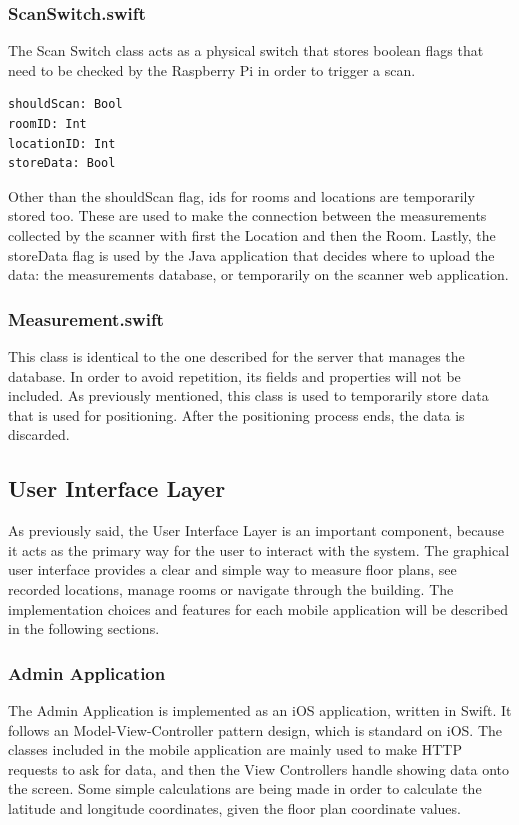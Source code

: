 \subsubsection*{ScanSwitch.swift}

The Scan Switch class acts as a physical switch that stores boolean flags that need to be checked by the Raspberry Pi in order to trigger a scan. 

\begin{lstlisting}
shouldScan: Bool
roomID: Int
locationID: Int
storeData: Bool
\end{lstlisting}

\noindent
Other than the shouldScan flag, ids for rooms and locations are temporarily stored too. These are used to make the connection between the measurements collected by the scanner with first the Location and then the Room. Lastly, the storeData flag is used by the Java application that decides where to upload the data: the measurements database, or temporarily on the scanner web application.

\subsubsection*{Measurement.swift}
This class is identical to the one described for the server that manages the database. In order to avoid repetition, its fields and properties will not be included. As previously mentioned, this class is used to temporarily store data that is used for positioning. After the positioning process ends, the data is discarded.

\subsection{User Interface Layer}
As previously said, the User Interface Layer is an important component, because it acts as the primary way for the user to interact with the system. The graphical user interface provides a clear and simple way to measure floor plans, see recorded locations, manage rooms or navigate through the building. The implementation choices and features for each mobile application will be described in the following sections.

\subsubsection{Admin Application}
The Admin Application is implemented as an iOS application, written in Swift. It follows an Model-View-Controller pattern design, which is standard on iOS. The classes included in the mobile application are mainly used to make HTTP requests to ask for data, and then the View Controllers handle showing data onto the screen. Some simple calculations are being made in order to calculate the latitude and longitude coordinates, given the floor plan coordinate values.

